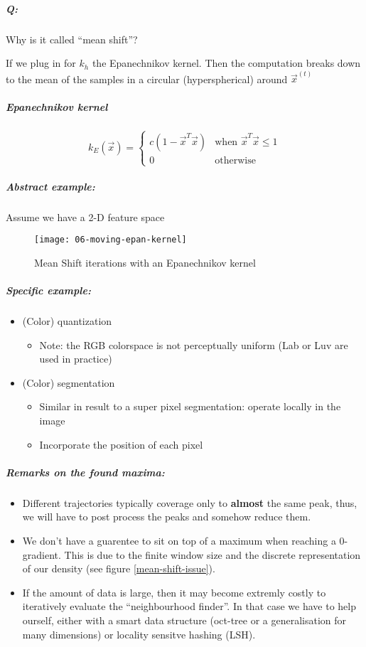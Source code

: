 \subparagraph{Q:} Why is it called ``mean shift''?

If we plug in for $k_h$ the Epanechnikov kernel. Then the computation breaks down to the mean of the samples in a circular (hyperspherical) around $\vec{x}^{(t)}$

\subparagraph{Epanechnikov kernel}

\begin{equation*}
  k_E(\vec{x}) = \begin{cases}
    c (1 - \vec{x}^T \vec{x})&\text{when } \vec{x}^T \vec{x} \le 1\\
    0 &\text{otherwise}
  \end{cases}
\end{equation*}

\subparagraph{Abstract example:}
Assume we have a 2-D feature space

\begin{figure}[H]
  \centering
  \texttt{[image: 06-moving-epan-kernel]}
  \caption{Mean Shift iterations with an Epanechnikov kernel}
\end{figure}

\subparagraph{Specific example:}
\begin{itemize}
  \item (Color) quantization
    \begin{itemize}
      \item Note: the RGB colorspace is not perceptually uniform (Lab or Luv are used in practice)
    \end{itemize}
  \item (Color) segmentation
    \begin{itemize}
      \item Similar in result to a super pixel segmentation: operate locally in the image
      \item Incorporate the position of each pixel
    \end{itemize}
\end{itemize}

\subparagraph{Remarks on the found maxima:}
\begin{itemize}
  \item Different trajectories typically coverage only to \textbf{almost} the same peak, thus, we will have to post process the peaks and somehow reduce them.
  \item We don't have a guarentee to sit on top of a maximum when reaching a 0-gradient. This is due to the finite window size and the discrete representation of our density (see figure \ref{mean-shift-issue}).
  \item \label{mean-shift-cost-effectiveness} If the amount of data is large, then it may become extremly costly to iteratively evaluate the ``neighbourhood finder''. In that case we have to help ourself, either with a smart data structure (oct-tree or a generalisation for many dimensions) or locality sensitve hashing (LSH).
\end{itemize}
